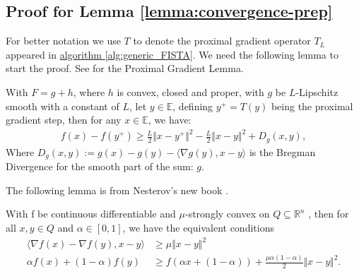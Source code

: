 \subsection{Proof for Lemma \ref*{lemma:convergence-prep}}
    For better notation we use $T$ to denote the proximal gradient operator $T_L$ appeared in \hyperref[alg:generic_FISTA]{algorithm \ref*{alg:generic_FISTA}}. 
    We need the following lemma to start the proof. 
    See \cite[remark 10.17]{beck_first-order_nodate} for the Proximal Gradient Lemma. 
    \begin{lemma}
        With $F = g + h$, where $h$ is convex, closed and proper, with $g$ be $L$-Lipschitz smooth with a constant of $L$, let $y\in \mathbb E$, defining $y^+ = T(y)$ being the proximal gradient step, then for any $x\in \mathbb E$, we have: 
        $$
        \begin{aligned}
        f(x) - f(y^+) \ge \frac{L}{2}\Vert x - y^+\Vert^2 - \frac{L}{2}\Vert x - y\Vert^2 + D_g(x, y),
        \end{aligned}
        $$
        Where $D_g(x, y):= g(x) - g(y) - \langle \nabla g(y), x -y\rangle$ is the Bregman Divergence for the smooth part of the sum: $g$. 
    \end{lemma}
    The following lemma is from Nesterov's new book \cite[thm 2.1.9, (2.1.23)]{nesterov_lectures_2018}. 
    \begin{lemma}
        With f be continuous differentiable and $\mu$-strongly convex on $Q\subseteq \mathbb R^n$ , then for all $x, y \in Q$ and $\alpha\in [0, 1]$, we have the equivalent conditions 
        \begin{align}
            \langle \nabla f(x) - \nabla f(y), x - y\rangle &\ge \mu
            \Vert x - y\Vert^2
            \\
            \alpha f(x) + (1 - \alpha) f(y) &\ge
            f(\alpha x + (1 - \alpha)) + 
            \frac{\mu \alpha(1 - \alpha)}{2}
            \Vert x - y\Vert^2. 
        \end{align}
        

    \end{lemma}
